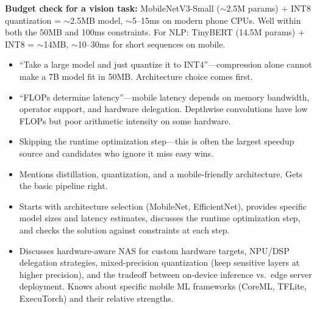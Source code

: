 \begin{interviewq}
\textbf{Budget check for a vision task:} MobileNetV3-Small ($\sim$2.5M params) + INT8 quantization = $\sim$2.5MB model, $\sim$5--15ms on modern phone CPUs. Well within both the 50MB and 100ms constraints. For NLP: TinyBERT (14.5M params) + INT8 = $\sim$14MB, $\sim$10--30ms for short sequences on mobile.

\redflags
\begin{itemize}
    \item ``Take a large model and just quantize it to INT4''---compression alone cannot make a 7B model fit in 50MB. Architecture choice comes first.
    \item ``FLOPs determine latency''---mobile latency depends on memory bandwidth, operator support, and hardware delegation. Depthwise convolutions have low FLOPs but poor arithmetic intensity on some hardware.
    \item Skipping the runtime optimization step---this is often the largest speedup source and candidates who ignore it miss easy wins.
\end{itemize}


\goodgreat
\begin{itemize}
    \item {} Mentions distillation, quantization, and a mobile-friendly architecture. Gets the basic pipeline right.
    \item {} Starts with architecture selection (MobileNet, EfficientNet), provides specific model sizes and latency estimates, discusses the runtime optimization step, and checks the solution against constraints at each step.
    \item {} Discusses hardware-aware NAS for custom hardware targets, NPU/DSP delegation strategies, mixed-precision quantization (keep sensitive layers at higher precision), and the tradeoff between on-device inference vs.\ edge server deployment. Knows about specific mobile ML frameworks (CoreML, TFLite, ExecuTorch) and their relative strengths.
\end{itemize}

\end{interviewq}

